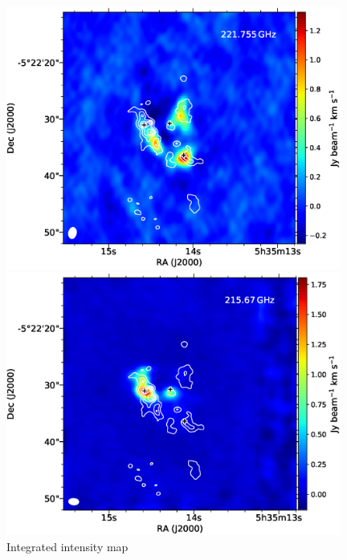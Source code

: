 \begin{figure}[htbp]
\begin{center}
\begin{minipage}{0.98\textwidth} 
\begin{center}
\begin{minipage}{0.48\textwidth}
\begin{center}
\includegraphics[width=0.98\textwidth]{OrionKL/mom0/221.755SV_mom0_3-7.eps}
\end{center}
\end{minipage}
\begin{minipage}{0.48\textwidth}
\begin{center}
\includegraphics[width=0.98\textwidth]{OrionKL/mom0/215.67mom0_3-7.eps}
\end{center}
\end{minipage}
\end{center}
\end{minipage}

\caption{Integrated intensity map}
\end{center}
\end{figure}

